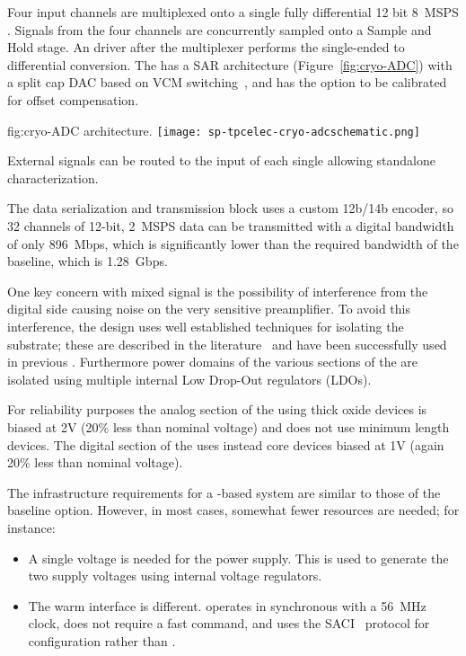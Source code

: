 Four input channels are multiplexed onto a single fully differential 12 bit \SI{8}{MSPS} . Signals from the four channels are concurrently sampled onto a Sample and Hold stage. An  driver after the multiplexer performs the single-ended to differential conversion. The  has a SAR architecture (Figure~\ref{fig:cryo-ADC}) with a split cap DAC based on VCM switching~\cite{5482529}, and has the option to be calibrated for offset compensation.

\begin{dunefigure}
{fig:cryo-ADC}
{  architecture.}
\texttt{[image: sp-tpcelec-cryo-adcschematic.png]}
\end{dunefigure}

External signals can be routed to the input of each single  allowing standalone characterization.

The data serialization and transmission block uses a custom 12b/14b encoder, so 32 channels of 12-bit, \SI{2}{MSPS} data can be transmitted with a digital bandwidth of only \SI{896}{Mbps}, which is significantly lower than the required bandwidth of the baseline, which is \SI{1.28}{Gbps}.

One key concern with mixed signal  is the possibility of interference from the digital side causing noise on the very sensitive preamplifier. To avoid this interference, the  design uses well established techniques for isolating the substrate; these are described in the literature~\cite{yeh} and have been successfully used in previous . Furthermore power domains of the various sections of the  are isolated using multiple internal Low Drop-Out regulators (LDOs).

For reliability purposes the analog section of the  using thick oxide devices is biased at 2V (20\% less than nominal voltage) and does not use minimum length devices. The digital section of the  uses instead core devices biased at 1V (again 20\% less than nominal voltage).

The infrastructure requirements for a  -based system are similar to those of the baseline option.  However, in most cases, somewhat fewer resources are needed; for instance:
\begin{itemize}
\item A single voltage is needed for the power supply. This is used to generate the two supply voltages using internal voltage regulators.
\item The warm interface is different.  operates in synchronous with a \SI{56}{MHz} clock, does not require a fast command, and uses the SACI~\cite{SACI} protocol for configuration rather than .
\end{itemize}

